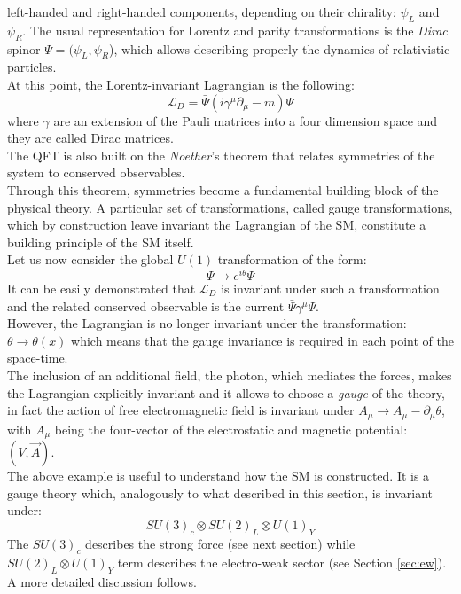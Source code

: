 left-handed and right-handed components, depending on their chirality: $\psi_{L}$ and $\psi_{R}$. The usual representation for Lorentz and 
parity transformations is the \textit{Dirac} spinor $\Psi = (\psi_{L},\psi_{R}$), which allows describing properly the dynamics of relativistic particles.
\vspace{\baselineskip}
\\At this point, the Lorentz-invariant Lagrangian is the following:
\begin{equation}
	\mathcal{L}_D  =  \bar{\Psi}(i\gamma^{\mu}\partial_{\mu}-m)\Psi
\end{equation}
where $\gamma$ are an extension of the Pauli matrices into a four dimension space and they are called Dirac matrices.
\vspace{\baselineskip}
\\The QFT is also built on the \textit{Noether}’s theorem that relates symmetries of the system to conserved observables.\\
Through this theorem, symmetries become a fundamental building block of the physical theory. 
A particular set of transformations, called gauge transformations, which by construction leave invariant the Lagrangian of the SM, 
constitute a building principle of the SM itself. 
\vspace{\baselineskip}
\\Let us now consider the global $U(1)$\footnotemark {}
transformation of the form: 
\begin{equation}
	\Psi \rightarrow e^{i\theta}\Psi
\end{equation}
It can be easily demonstrated that $\mathcal{L}_D$ is invariant under such a transformation and the related conserved observable is
the current $\bar{\Psi}\gamma^{\mu}\Psi$. \\
However, the Lagrangian is no longer invariant under the transformation: $\theta\rightarrow\theta (x)$ which means that the gauge 
invariance is required in each point of the space-time.
\\The inclusion of an additional field, the photon, which mediates the forces, makes the Lagrangian explicitly invariant and it allows
to choose a \textit{gauge} of the theory, in fact the action of free electromagnetic field is invariant under $A_{\mu}\rightarrow A_{\mu}-\partial_{\mu}\theta$,
with $A_{\mu}$ being the four-vector of the electrostatic and magnetic potential: $(V,\vec{A})$.
\vspace{\baselineskip}
\\The above example is useful to understand how the SM is constructed. It is a gauge theory which, analogously to what described in
this section, is invariant under:
\begin{equation} 
	SU(3)_{c} \otimes SU(2)_{L} \otimes U(1)_{Y}
\end{equation}
The $SU(3)_{c}$ describes the strong force (see next section) while $SU(2)_{L} \otimes U(1)_{Y}$ term describes the electro-weak sector (see Section \ref{sec:ew}). 
A more detailed discussion follows.

